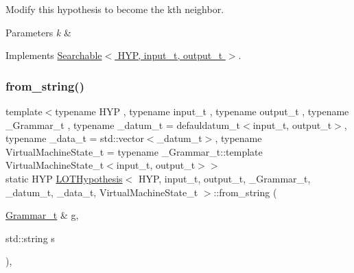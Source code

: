 Modify this hypothesis to become the k\textquotesingle{}th neighbor. 


\begin{DoxyParams}{Parameters}
{\em k} & \\
\hline
\end{DoxyParams}


Implements \hyperlink{class_searchable_a1786307b9f2dadc8c66c94adef220270}{Searchable$<$ H\+Y\+P, input\+\_\+t, output\+\_\+t $>$}.

\mbox{\label{class_l_o_t_hypothesis_aa1e3f898618de841bfd8c9279a107211}} 
\subsubsection{\texorpdfstring{from\+\_\+string()}{from\_string()}}
{\footnotesize\ttfamily template$<$typename H\+YP , typename input\+\_\+t , typename output\+\_\+t , typename \+\_\+\+Grammar\+\_\+t , typename \+\_\+datum\+\_\+t  = defauldatum\+\_\+t$<$input\+\_\+t, output\+\_\+t$>$, typename \+\_\+data\+\_\+t  = std\+::vector$<$\+\_\+datum\+\_\+t$>$, typename Virtual\+Machine\+State\+\_\+t  = typename \+\_\+\+Grammar\+\_\+t\+::template Virtual\+Machine\+State\+\_\+t$<$input\+\_\+t, output\+\_\+t$>$$>$ \\
static H\+YP \hyperlink{class_l_o_t_hypothesis}{L\+O\+T\+Hypothesis}$<$ H\+YP, input\+\_\+t, output\+\_\+t, \+\_\+\+Grammar\+\_\+t, \+\_\+datum\+\_\+t, \+\_\+data\+\_\+t, Virtual\+Machine\+State\+\_\+t $>$\+::from\+\_\+string (\begin{DoxyParamCaption}\item[{\hyperlink{class_l_o_t_hypothesis_a8006204013d471860e54c49d19edbace}{Grammar\+\_\+t} \&}]{g,  }\item[{std\+::string}]{s }\end{DoxyParamCaption})\hspace{0.3cm}{\ttfamily [inline]}, {\ttfamily [static]}}

\mbox{\label{class_l_o_t_hypothesis_a1e3549444ffc1c34768a15f510ea0888}} 
